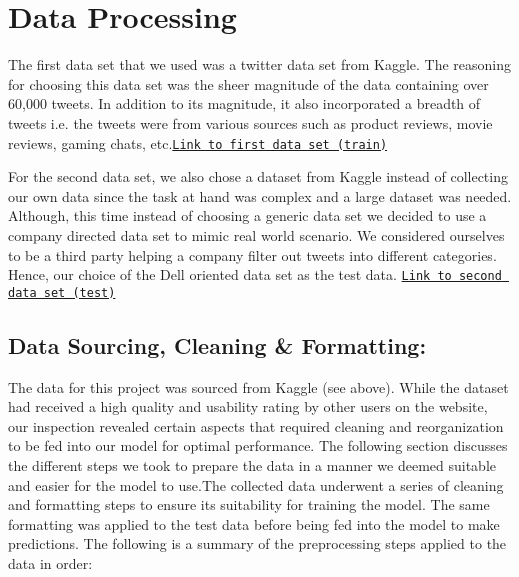 \section{Data Processing}

The first data set that we used was a twitter data set from Kaggle. The reasoning for choosing this data set was the sheer magnitude of the data containing over 60,000 tweets. In addition to its magnitude, it also incorporated a breadth of tweets i.e. the tweets were from various sources such as product reviews, movie reviews, gaming chats, etc.\href{https://www.kaggle.com/datasets/jp797498e/twitter-entity-sentiment-analysis}{\texttt{Link to first data set (train)}} 

For the second data set, we also chose a dataset from Kaggle instead of collecting our own data since the task at hand was complex and a large dataset was needed. Although, this time instead of choosing a generic data set we decided to use a company directed data set to mimic real world scenario. We considered ourselves to be a third party helping a company filter out tweets into different categories. Hence, our choice of the Dell oriented data set as the test data. \href{https://www.kaggle.com/datasets/ankitkumar2635/sentiment-and-emotions-of-tweets}{\texttt{Link to second data set (test)}}
\vspace{-1em}
\subsection{Data Sourcing, Cleaning \& Formatting:}
\vspace{-1em}
The data for this project was sourced from Kaggle (see above). While the dataset had received a high quality and usability rating by other users on the website, our inspection revealed certain aspects that required cleaning and reorganization to be fed into our model for optimal performance. The following section discusses the different steps we took to prepare the data in a manner we deemed suitable and easier for the model to use.The collected data underwent a series of cleaning and formatting steps to ensure its suitability for training the model. The same formatting was applied to the test data before being fed into the model to make predictions. The following is a summary of the preprocessing steps applied to the data in order:

